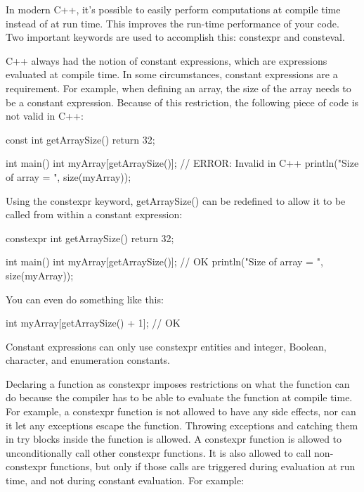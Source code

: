 
In modern C++, it’s possible to easily perform computations at compile time instead of at run time. This improves the run-time performance of your code. Two important keywords are used to accomplish this: constexpr and consteval.


C++ always had the notion of constant expressions, which are expressions evaluated at compile time. In some circumstances, constant expressions are a requirement. For example, when defining an array, the size of the array needs to be a constant expression. Because of this restriction, the following piece of code is not valid in C++:

\begin{cpp}
const int getArraySize() { return 32; }

int main()
{
    int myArray[getArraySize()]; // ERROR: Invalid in C++
    println("Size of array = {}", size(myArray));
}
\end{cpp}

Using the constexpr keyword, getArraySize() can be redefined to allow it to be called from within a constant expression:

\begin{cpp}
constexpr int getArraySize() { return 32; }

int main()
{
    int myArray[getArraySize()]; // OK
    println("Size of array = {}", size(myArray));
}
\end{cpp}

You can even do something like this:

\begin{cpp}
int myArray[getArraySize() + 1]; // OK
\end{cpp}

Constant expressions can only use constexpr entities and integer, Boolean, character, and enumeration constants.

Declaring a function as constexpr imposes restrictions on what the function can do because the compiler has to be able to evaluate the function at compile time. For example, a constexpr function is not allowed to have any side effects, nor can it let any exceptions escape the function. Throwing exceptions and catching them in try blocks inside the function is allowed. A constexpr function is allowed to unconditionally call other constexpr functions. It is also allowed to call non-constexpr functions, but only if those calls are triggered during evaluation at run time, and not during constant evaluation. For example:

